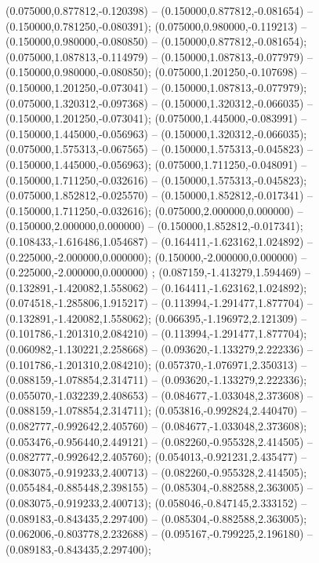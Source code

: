 (0.075000,0.877812,-0.120398) -- (0.150000,0.877812,-0.081654) -- (0.150000,0.781250,-0.080391);
 (0.075000,0.980000,-0.119213) -- (0.150000,0.980000,-0.080850) -- (0.150000,0.877812,-0.081654);
 (0.075000,1.087813,-0.114979) -- (0.150000,1.087813,-0.077979) -- (0.150000,0.980000,-0.080850);
 (0.075000,1.201250,-0.107698) -- (0.150000,1.201250,-0.073041) -- (0.150000,1.087813,-0.077979);
 (0.075000,1.320312,-0.097368) -- (0.150000,1.320312,-0.066035) -- (0.150000,1.201250,-0.073041);
 (0.075000,1.445000,-0.083991) -- (0.150000,1.445000,-0.056963) -- (0.150000,1.320312,-0.066035);
 (0.075000,1.575313,-0.067565) -- (0.150000,1.575313,-0.045823) -- (0.150000,1.445000,-0.056963);
 (0.075000,1.711250,-0.048091) -- (0.150000,1.711250,-0.032616) -- (0.150000,1.575313,-0.045823);
 (0.075000,1.852812,-0.025570) -- (0.150000,1.852812,-0.017341) -- (0.150000,1.711250,-0.032616);
 (0.075000,2.000000,0.000000) -- (0.150000,2.000000,0.000000) -- (0.150000,1.852812,-0.017341);
 (0.108433,-1.616486,1.054687) -- (0.164411,-1.623162,1.024892) -- (0.225000,-2.000000,0.000000);
 (0.150000,-2.000000,0.000000) -- (0.225000,-2.000000,0.000000) ;
 (0.087159,-1.413279,1.594469) -- (0.132891,-1.420082,1.558062) -- (0.164411,-1.623162,1.024892);
 (0.074518,-1.285806,1.915217) -- (0.113994,-1.291477,1.877704) -- (0.132891,-1.420082,1.558062);
 (0.066395,-1.196972,2.121309) -- (0.101786,-1.201310,2.084210) -- (0.113994,-1.291477,1.877704);
 (0.060982,-1.130221,2.258668) -- (0.093620,-1.133279,2.222336) -- (0.101786,-1.201310,2.084210);
 (0.057370,-1.076971,2.350313) -- (0.088159,-1.078854,2.314711) -- (0.093620,-1.133279,2.222336);
 (0.055070,-1.032239,2.408653) -- (0.084677,-1.033048,2.373608) -- (0.088159,-1.078854,2.314711);
 (0.053816,-0.992824,2.440470) -- (0.082777,-0.992642,2.405760) -- (0.084677,-1.033048,2.373608);
 (0.053476,-0.956440,2.449121) -- (0.082260,-0.955328,2.414505) -- (0.082777,-0.992642,2.405760);
 (0.054013,-0.921231,2.435477) -- (0.083075,-0.919233,2.400713) -- (0.082260,-0.955328,2.414505);
 (0.055484,-0.885448,2.398155) -- (0.085304,-0.882588,2.363005) -- (0.083075,-0.919233,2.400713);
 (0.058046,-0.847145,2.333152) -- (0.089183,-0.843435,2.297400) -- (0.085304,-0.882588,2.363005);
 (0.062006,-0.803778,2.232688) -- (0.095167,-0.799225,2.196180) -- (0.089183,-0.843435,2.297400);
